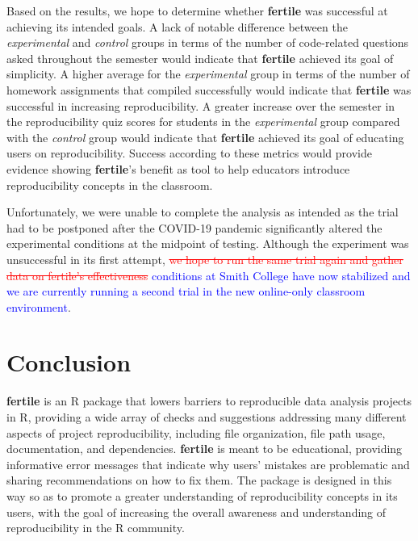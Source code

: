 \documentclass[APA,LATO1COL]{WileyNJD-v2}\usepackage[]{graphicx}\usepackage[]{color}
\newcommand{\R}{\textsf{R}\xspace}
\newcommand{\pkg}[1]{\textbf{#1}}
\begin{document}
Based on the results, we hope to determine whether \pkg{fertile} was successful at achieving its intended goals. A lack of notable difference between the \emph{experimental} and \emph{control} groups in terms of the number of code-related questions asked throughout the semester would indicate that \pkg{fertile} achieved its goal of simplicity. A higher average for the \emph{experimental} group in terms of the number of homework assignments that compiled successfully would indicate that \pkg{fertile} was successful in increasing reproducibility. A greater increase over the semester in the reproducibility quiz scores for students in the \emph{experimental} group compared with the \emph{control} group would indicate that \pkg{fertile} achieved its goal of educating users on reproducibility. Success according to these metrics would provide evidence showing \pkg{fertile}'s benefit as tool to help educators introduce reproducibility concepts in the classroom.

Unfortunately, we were unable to complete the analysis as intended as the trial had to be postponed after the COVID-19 pandemic significantly altered the experimental conditions at the midpoint of testing. Although the experiment was unsuccessful in its first attempt, \textcolor{red}{\st{we hope to run the same trial again and gather data on fertile's effectiveness}} \textcolor{blue}{conditions at Smith College have now stabilized and we are currently running a second trial in the new online-only classroom environment}. 



\section{Conclusion}\label{sec:conclusion}


\pkg{fertile} is an \R package that lowers barriers to reproducible data analysis projects in \R, providing a wide array of checks and suggestions addressing many different aspects of project reproducibility, including file organization, file path usage, documentation, and dependencies.
\pkg{fertile} is meant to be educational, providing informative error messages that indicate why users' mistakes are problematic and sharing recommendations on how to fix them. The package is designed in this way so as to promote a greater understanding of reproducibility concepts in its users, with the goal of increasing the overall awareness and understanding of reproducibility in the \R community.
\end{document}
